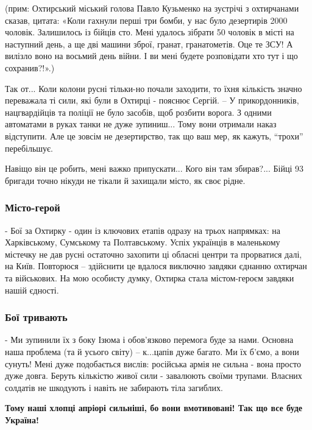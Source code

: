 (прим: Охтирський міський голова Павло Кузьменко на зустрічі з охтирчанами
сказав, цитата: «Коли гахнули перші три бомби, у нас було дезертирів 2000
чоловік. Залишилось із бійців сто. Мені удалось зібрати 50 чоловік в місті на
наступний день, а ще дві машини зброї, гранат, гранатометів. Оце те ЗСУ! А
вилізло воно на восьмий день війни. І ви мені будете розповідати хто тут і що
сохранив?!».)

Так от... Коли колони русні тільки-но почали заходити, то їхня кількість значно
переважала ті сили, які були в Охтирці - пояснює Сергій. – У прикордонників,
нацгвардійців та поліції не було засобів, щоб розбити ворога. З одними
автоматами в руках танки не дуже зупиниш... Тому вони отримали наказ
відступити. Але це зовсім не дезертирство, так що ваш мер, як кажуть,
\enquote{трохи} перебільшує.

Навіщо він це робить, мені важко припускати... Кого він там збирав?... Бійці 93
бригади точно нікуди не тікали й захищали місто, як своє рідне. 

\subsubsection{Місто-герой}

- Бої за Охтирку - один із ключових етапів одразу на трьох напрямках: на
Харківському, Сумському та Полтавському. Успіх українців в маленькому містечку
не дав русні остаточно захопити ці обласні центри та прорватися далі, на Київ.
Повторюся – здійснити це вдалося виключно завдяки єднанню охтирчан та
військових. На мою особисту думку, Охтирка стала містом-героєм завдяки нашій
єдності.

\subsubsection{Бої тривають}

- Ми зупинили їх з боку Ізюма і обов'язково перемога буде за нами. Основна наша
проблема (та й усього світу) – к...цапів дуже багато. Ми їх б'ємо, а вони
сунуть! Мені дуже подобається вислів: російська армія не сильна - вона просто
дуже довга. Беруть кількістю живої сили - завалюють своїми трупами. Власних
солдатів не шкодують і навіть не забирають тіла загиблих.

\textbf{Тому наші хлопці апріорі сильніші, бо вони вмотивовані! Так що все буде
Україна!}

